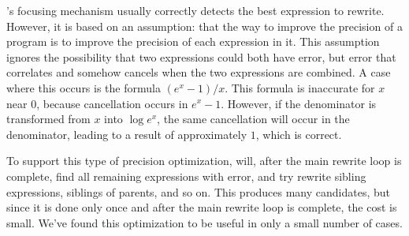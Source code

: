 \documentclass[paper.tex]{subfiles}
\begin{document}
\casio's focusing mechanism usually correctly detects
  the best expression to rewrite.
However, it is based on an assumption:
  that the way to improve the precision of a program
  is to improve the precision of each expression in it.
This assumption ignores the possibility
  that two expressions could both have error,
  but error that correlates and somehow cancels
  when the two expressions are combined.
A case where this occurs is the formula $(e^x - 1) / x$.
This formula is inaccurate for $x$ near $0$,
  because cancellation occurs in $e^x - 1$.
However, if the denominator is transformed from $x$ into $\log e^x$,
  the same cancellation will occur in the denominator,
  leading to a result of approximately $1$, which is correct.

To support this type of precision optimization,
  \casio will, after the main rewrite loop is complete,
  find all remaining expressions with error,
  and try rewrite sibling expressions, siblings of parents, and so on.
This produces many candidates, but since it is done only once
  and after the main rewrite loop is complete, the cost is small.
We've found this optimization to be useful in only a small number of cases.
\end{document}
